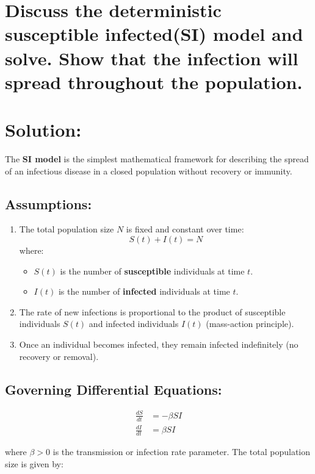 \section{Discuss the deterministic susceptible infected(SI) model and solve. Show that the infection will spread throughout the population.}
\section*{Solution:}

The \textbf{SI model} is the simplest mathematical framework for describing the spread of an infectious disease in a closed population without recovery or immunity.

\subsection*{Assumptions:}
\begin{enumerate}
    \item The total population size $N$ is fixed and constant over time:
    \[
    S(t) + I(t) = N
    \]
    where:
    \begin{itemize}
        \item $S(t)$ is the number of \textbf{susceptible} individuals at time $t$.
        \item $I(t)$ is the number of \textbf{infected} individuals at time $t$.
    \end{itemize}
    \item The rate of new infections is proportional to the product of susceptible individuals $S(t)$ and infected individuals $I(t)$ (mass-action principle).
    \item Once an individual becomes infected, they remain infected indefinitely (no recovery or removal).
\end{enumerate}

\subsection*{Governing Differential Equations:}
\begin{align*}
    \frac{dS}{dt} &= -\beta S I  \\[0.8em]
    \frac{dI}{dt} &= \beta S I 
\end{align*}

\noindent where $\beta > 0$ is the transmission or infection rate parameter.
\noindent The total population size is given by:

